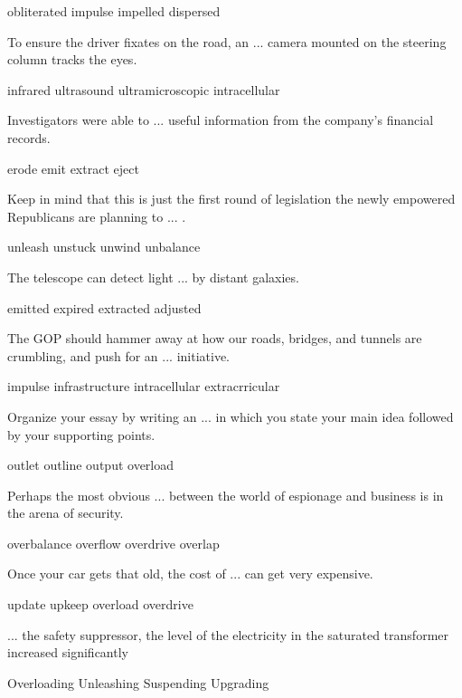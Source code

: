 \documentclass{exam}
\begin{document}
\begin{questions}
\begin{oneparchoices}
 \choice obliterated
 \choice impulse
\correctchoice impelled
 \choice dispersed
\end{oneparchoices}
\question To ensure the driver fixates on the road, an ... camera mounted on the steering column tracks the eyes.\\
\begin{oneparchoices}
 \correctchoice infrared 
 \choice ultrasound
 \choice ultramicroscopic 
 \choice intracellular
\end{oneparchoices}
\question Investigators were able to ... useful information from the company's financial records.\\
\begin{oneparchoices}
 \choice erode
 \choice emit
 \correctchoice extract
 \choice eject
\end{oneparchoices}
\question Keep in mind that this is just the first round of legislation the newly empowered Republicans are planning to ... .\\
\begin{oneparchoices} 
\correctchoice unleash
\choice unstuck
\choice unwind
\choice unbalance 
\end{oneparchoices}
\question The telescope can detect light ... by distant galaxies.\\
\begin{oneparchoices}
 \correctchoice emitted
 \choice expired 
 \choice extracted
 \choice adjusted
\end{oneparchoices}
\question The GOP should hammer away at how our roads, bridges, and tunnels are crumbling, and push for an ... initiative.\\
\begin{oneparchoices}
\choice impulse 
 \correctchoice infrastructure
 \choice intracellular
 \choice extracrricular
\end{oneparchoices}
\question Organize your essay by writing an ... in which you state your main idea followed by your supporting points.\\
\begin{oneparchoices}
\choice outlet
 \correctchoice outline
 \choice output
 \choice overload 
\end{oneparchoices}
\question Perhaps the most obvious ... between the world of espionage and business is in the arena of security.\\
\begin{oneparchoices}
\choice overbalance
 \choice overflow
 \choice overdrive
 \correctchoice overlap
\end{oneparchoices}
\question Once your car gets that old, the cost of ... can get very expensive.\\
\begin{oneparchoices}
\choice update 
\correctchoice upkeep
 \choice overload
 \choice overdrive 
\end{oneparchoices}
\question ... the safety suppressor, the level of the electricity in the saturated transformer increased significantly\\
\begin{oneparchoices}
\choice Overloading
 \correctchoice Unleashing
 \choice Suspending
 \choice Upgrading
\end{oneparchoices}


\end{questions}
\end{document}
